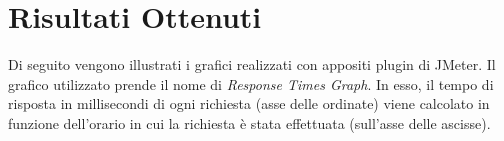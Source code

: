 
\section{Risultati Ottenuti}
Di seguito vengono illustrati i grafici realizzati con appositi plugin di JMeter. Il grafico utilizzato prende il nome di \emph{Response Times Graph}. In esso, il tempo di risposta in millisecondi di ogni richiesta (asse delle ordinate) viene calcolato in funzione dell'orario in cui la richiesta è stata effettuata (sull'asse delle ascisse).

